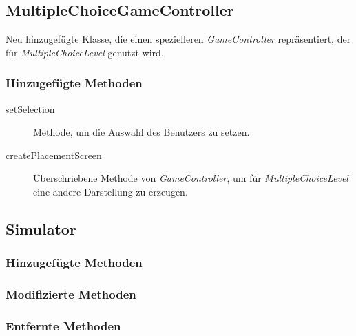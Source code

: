 \subsection{MultipleChoiceGameController}
Neu hinzugefügte Klasse, die einen spezielleren \emph{GameController} repräsentiert, der für \emph{MultipleChoiceLevel} genutzt wird.

\subsubsection{Hinzugefügte Methoden}
\begin{description}
\item[setSelection]
Methode, um die Auswahl des Benutzers zu setzen.
\item[createPlacementScreen]
Überschriebene Methode von \emph{GameController}, um für \emph{MultipleChoiceLevel} eine andere Darstellung zu erzeugen.
\end{description}


\subsection{Simulator}

\subsubsection{Hinzugefügte Methoden}

\subsubsection{Modifizierte Methoden}

\subsubsection{Entfernte Methoden}

